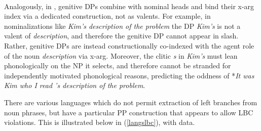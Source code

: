 \documentclass[output=paper
 	        ,biblatex
                ,babelshorthands
                ,newtxmath
                ,draftmode
                ,colorlinks, citecolor=brown
]{langscibook}
\begin{document}
\ea \label{the68}
\zlast

\noindent\\
Analogously, in  \citet[133]{cxsag07},  genitive DPs combine with nominal heads and bind their {\sc x-arg} index via a dedicated  construction, not as valents.
For example,  in nominalizations like \emph{Kim's description of the problem} the  DP \emph{Kim's} is not a valent of \emph{description}, and  therefore the genitive DP cannot appear in {\sc slash}.
 Rather, genitive DPs are instead constructionally co-indexed with the agent role of the noun \emph{description}  via {\sc x-arg}.  
 Moreover, the clitic \emph{s} in \emph{Kim's} must lean phonologically on the NP it selects, and therefore cannot be stranded for independently motivated phonological reasons, predicting  the oddness of *\emph{It was Kim who I read 's description of the problem}.

There are various  languages  which do not permit extraction of left branches from noun phrases, 
but have a particular PP construction that appears to allow LBC violations.
This is illustrated below in (\ref{langslbc}), with  data. 

\eal \label{langslbc}
\end{document}

